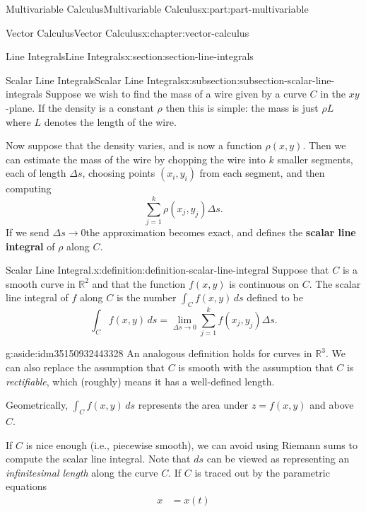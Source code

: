 \documentclass[twoside,10pt,]{book}
\newcommand{\terminology}[1]{\textbf{#1}}
\numberwithin{equation}{part}
\newcommand{\RR}{\mathbb{R}}
\newcommand{\amp}{&}
\begin{document}
\begin{partptx}{Multivariable Calculus}{}{Multivariable Calculus}{}{}{x:part:part-multivariable}
\begin{chapterptx}{Vector Calculus}{}{Vector Calculus}{}{}{x:chapter:vector-calculus}
\begin{sectionptx}{Line Integrals}{}{Line Integrals}{}{}{x:section:section-line-integrals}
\typeout{************************************************}
%
\begin{subsectionptx}{Scalar Line Integrals}{}{Scalar Line Integrals}{}{}{x:subsection:subsection-scalar-line-integrals}
Suppose we wish to find the mass of a wire given by a curve \(C\) in the \(xy\)-plane. If the density is a constant \(\rho\) then this is simple: the mass is just \(\rho L\) where \(L\) denotes the length of the wire.%
\par
Now suppose that the density varies, and is now a function \(\rho(x,y)\). Then we can estimate the mass of the wire by chopping the wire into \(k\) smaller segments, each of length \(\Delta s\), choosing points \((x_{i},y_{i})\) from each segment, and then computing%
\begin{equation*}
\sum_{j=1}^{k}\rho(x_{j}, y_{j})\Delta s\text{.}
\end{equation*}
If we send \(\Delta s\to 0\)the approximation becomes exact, and defines the \terminology{scalar line integral} of \(\rho\) along \(C\).%
\begin{definition}{Scalar Line Integral.}{x:definition:definition-scalar-line-integral}%
%
Suppose that \(C\) is a smooth curve in \(\RR^{2}\) and that the function \(f(x,y)\) is continuous on \(C\). The scalar line integral of \(f\) along \(C\) is the number \(\int_{C}f(x,y)\,ds\) defined to be%
\begin{equation*}
\int_{C}f(x,y)\,ds = \lim_{\Delta s\to 0}\sum_{j=1}^{k}f(x_{j},y_{j})\Delta s\text{.}
\end{equation*}
%
\begin{aside}{}{g:aside:idm35150932443328}%
An analogous definition holds for curves in \(\RR^{3}\). We can also replace the assumption that \(C\) is smooth with the assumption that \(C\) is \emph{rectifiable}, which (roughly) means it has a well-defined length.%
\end{aside}
\end{definition}
Geometrically, \(\int_{C}f(x,y)\,ds\) represents the area under \(z = f(x,y)\) and above \(C\).%
\par
If \(C\) is nice enough (i.e., piecewise smooth), we can avoid using Riemann sums to compute the scalar line integral. Note that \(ds\) can be viewed as representing an \emph{infinitesimal length} along the curve \(C\). If \(C\) is traced out by the parametric equations%
\begin{align*}
x \amp = x(t) \\

\end{align*}
\end{subsectionptx}
\end{sectionptx}
\end{chapterptx}
\end{partptx}
\end{document}
